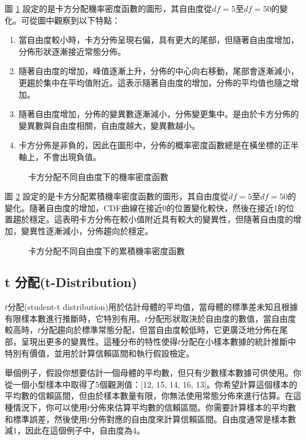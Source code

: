 圖 \ref{fig:chi-squared-pdf} 設定的是卡方分配機率密度函數的圖形，其自由度從$df=5$至$df=50$的變化。可從圖中觀察到以下特點：
\begin{enumerate}
\item 當自由度較小時，卡方分佈呈現右偏，具有更大的尾部，但隨著自由度增加，分佈形狀逐漸接近常態分佈。
\item 隨著自由度的增加，峰值逐漸上升，分佈的中心向右移動，尾部會逐漸減小，更趨於集中在平均值附近。這表示隨著自由度的增加，分佈的平均值也隨之增加。
\item 隨著自由度增加，分佈的變異數逐漸減小，分佈變更集中。是由於卡方分佈的變異數與自由度相關，自由度越大，變異數越小。
\item 卡方分佈是非負的，因此在圖形中，分佈的概率密度函數總是在橫坐標的正半軸上，不會出現負值。
\end{enumerate}
\begin{figure}[H]
    \caption{卡方分配不同自由度下的機率密度函數}
    \label{fig:chi-squared-pdf}
\end{figure}
圖 \ref{fig:chi-squared-cdf} 設定的是卡方分配累積機率密度函數的圖形，其自由度從$df=5$至$df=50$的變化。隨著自由度的增加，CDF曲線在接近0的位置變化較快，然後在接近1的位置趨於穩定。這表明卡方分佈在較小值附近具有較大的變異性，但隨著自由度的增加，變異性逐漸減小，分佈趨向於穩定。
\begin{figure}[H]
    \caption{卡方分配不同自由度下的累積機率密度函數}
    \label{fig:chi-squared-cdf}
\end{figure}
\subsection{t 分配(t-Distribution)}
$t$分配(student-t distribution)用於估計母體的平均值，當母體的標準差未知且根據有限樣本數進行推斷時，它特別有用。$t$分配形狀取決於自由度的數值，當自由度較高時，$t$分配趨向於標準常態分配，但當自由度較低時，它更廣泛地分佈在尾部，呈現出更多的變異性。這種分布的特性使得$t$分配在小樣本數據的統計推斷中特別有價值，並用於計算信賴區間和執行假設檢定。

舉個例子，假設你想要估計一個母體的平均數，但只有少數樣本數據可供使用。你從一個小型樣本中取得了5個觀測值：[12, 15, 14, 16, 13]。你希望計算這個樣本的平均數的信賴區間，但由於樣本數量有限，你無法使用常態分佈來進行估算。在這種情況下，你可以使用$t$分佈來估算平均數的信賴區間。你需要計算樣本的平均數和標準誤差，然後使用$t$分佈對應的自由度來計算信賴區間。自由度通常是樣本數減1，因此在這個例子中，自由度為4。


